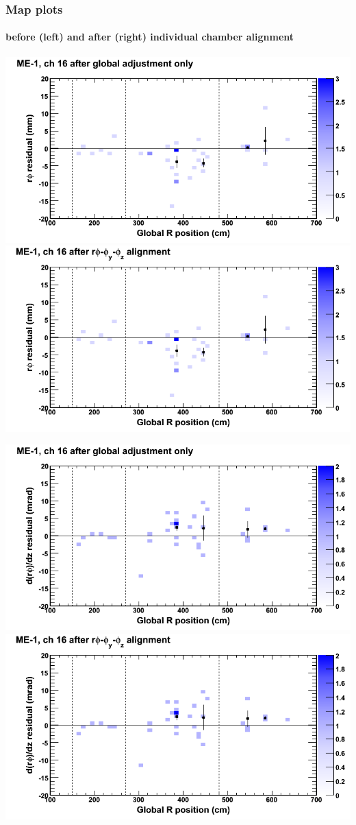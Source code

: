\documentclass[compress]{beamer}
\begin{document}
\begin{frame}
\frametitle{Map plots}
\framesubtitle{before (left) and after (right) individual chamber alignment}
\includegraphics[width=0.5\linewidth]{ringmapplots_3dof/before_CSCvsr_mem1ch16_x.png} \includegraphics[width=0.5\linewidth]{ringmapplots_3dof/after_CSCvsr_mem1ch16_x.png}

\includegraphics[width=0.5\linewidth]{ringmapplots_3dof/before_CSCvsr_mem1ch16_dxdz.png} \includegraphics[width=0.5\linewidth]{ringmapplots_3dof/after_CSCvsr_mem1ch16_dxdz.png}
\end{frame}
\end{document}
